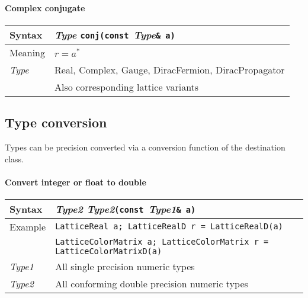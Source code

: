 \documentclass[12pt,letterpaper]{article}
\newcommand{\tReal}{Real}
\newcommand{\tComplex}{Complex}
\newcommand{\tColorMatrix}{Gauge}
\newcommand{\tDiracFermion}{DiracFermion}
\newcommand{\tDiracPropagator}{DiracPropagator}
\newcommand{\simLatticeVariants}{Also corresponding lattice variants}
\newcommand{\itt}{\it Type}
\newcommand{\protoUnaryQual}[1]{{\it Type }{\tt #1}{\tt (const }{\it Type}{\tt \& a)}}
\begin{document}
\paragraph{Complex conjugate}

\begin{flushleft}
  \begin{tabular}{|l|l|}
  \hline
  Syntax      & \protoUnaryQual{\tt conj}  \\
  \hline
  Meaning     & $r = a^*$ \\
  \hline
  \itt        & \tReal, \tComplex, \tColorMatrix, \tDiracFermion, \tDiracPropagator \\
              & \simLatticeVariants \\
  \hline
  \end{tabular}
\end{flushleft}

\subsection{Type conversion}

Types can be precision converted via a conversion function of the destination
class.

\paragraph{Convert integer or float to double}
\begin{flushleft}
  \begin{tabular}{|l|l|}
  \hline
  Syntax      & {\it Type2 Type2}{\tt (const }{\it Type1}{\tt \& a)} \\
  \hline
  Example     & \verb|LatticeReal a; LatticeRealD r = LatticeRealD(a)| \\
              & \verb|LatticeColorMatrix a; LatticeColorMatrix r = LatticeColorMatrixD(a)| \\
  \hline
  {\it Type1} & All single precision numeric types \\
  {\it Type2} & All conforming double precision numeric types \\
  \hline
  \end{tabular}
\end{flushleft}
\end{document}
